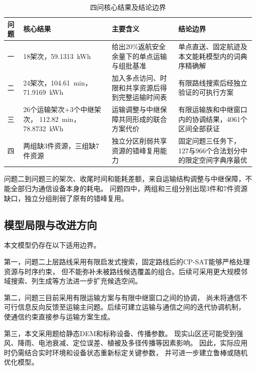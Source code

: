 \begin{table}[htbp]
    \centering
    \caption{四问核心结果及结论边界}
    \label{tab:overall_results}
    \small
    \begin{tabular}{p{1.0cm}p{4.2cm}p{4.5cm}p{4.7cm}}
        \hline
        问题 & 核心结果 & 主要含义 & 结论边界 \\
        \hline
        一 &
        18架次，59.1313~kWh &
        给出20\%返航安全余量下的单点运输与组批基准 &
        单点直送、固定航迹及本文能耗模型内的词典序精确解 \\

        二 &
        24架次，104.61~min，71.9169~kWh &
        加入多点访问、时限和共享资源后得到完整运输时间表 &
        有限路线搜索后经独立验证的可执行方案 \\

        三 &
        26个运输架次+3个中继架次，
        112.82~min，78.8732~kWh &
        运输调整与中继保障共同形成的联合方案代价 &
        有限运输族和中继窗口内的协调结果，4061个区间全部获证 \\

        四 &
        两组缺3件资源，三组缺7件资源 &
        独立分区削弱共享资源的错峰复用能力 &
        固定问题三任务下，127与966个合法划分中的限定空间字典序最优 \\
        \hline
    \end{tabular}
\end{table}

问题二到问题三的架次、收尾时间和能耗差额，来自运输结构调整与中继保障，不能全部归为通信设备本身的耗电。
问题四中，两组和三组分别出现3件和7件资源缺口，独立分组削弱了原有的错峰复用。

\subsection{模型局限与改进方向}

本文模型仍存在以下适用边界。

第一，问题二上层路线采用有限启发式搜索，固定路线后的CP-SAT能够严格处理资源与时序约束，
但不能弥补未被路线候选覆盖的组合。后续可采用更大规模邻域搜索、列生成等方法进一步扩充候选空间。

第二，问题三目前采用有限运输方案与有限中继窗口之间的协调，
尚未将通信不可行信息反向反馈至运输主问题。后续可建立运输与通信之间的迭代协调机制，
使通信约束直接参与运输方案生成。

第三，本文采用题给静态DEM和标称设备、传播参数。
现实山区还可能受到强风、降雨、电池衰减、定位误差、植被及多径传播等因素影响。
因此，实际应用时仍需结合实时环境和设备状态重新标定关键参数，
并可进一步建立鲁棒或随机优化模型。

